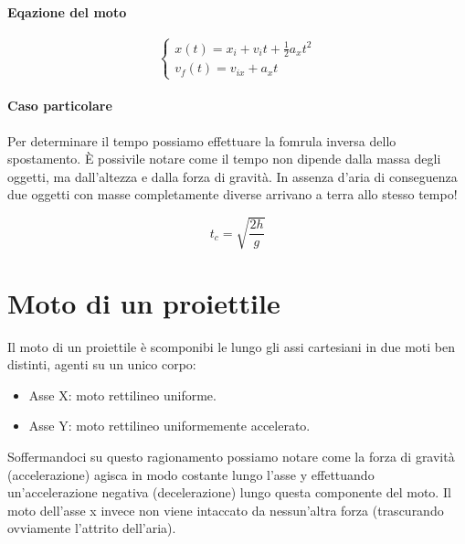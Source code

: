         \paragraph{Eqazione del moto}
            \begin{equation}
                \begin{cases}
                    x(t)=x_{i}+v_{i}t+\frac{1}{2}a_{x}t^2 \\
                    v_{f}(t) = v_{ix}+a_{x}t
                \end{cases}
            \end{equation}
    
        \paragraph{Caso particolare}
            Per determinare il tempo possiamo effettuare la fomrula inversa 
            dello spostamento. È possivile notare come il tempo non dipende 
            dalla massa degli oggetti, ma dall'altezza e dalla forza di gravità.
            In assenza d'aria di conseguenza due oggetti con masse completamente
            diverse arrivano a terra allo stesso tempo!

            \begin{equation}
                t_c=\sqrt{\frac{2h}{g}}
            \end{equation}

    \section{Moto di un proiettile} 

        Il moto di un proiettile è scomponibi le lungo gli assi cartesiani in 
        due moti ben distinti, agenti su un unico corpo:
        \begin{itemize}
            \item Asse X: moto rettilineo uniforme.
            \item Asse Y: moto rettilineo uniformemente accelerato.
        \end{itemize}
        Soffermandoci su questo ragionamento possiamo notare come la forza di 
        gravità (accelerazione) agisca in modo costante lungo l'asse y 
        effettuando un'accelerazione negativa (decelerazione) lungo questa 
        componente del moto. Il moto dell'asse x invece non viene intaccato da 
        nessun'altra forza (trascurando ovviamente l'attrito dell'aria).
        
